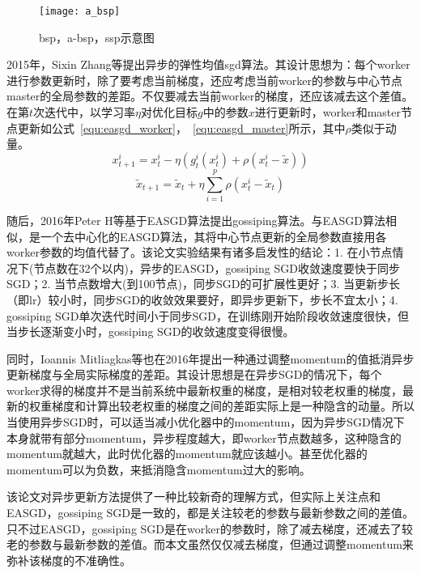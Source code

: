 \begin{figure}[htp]
\centering
\texttt{[image: a\_bsp]}
\caption{bsp，a-bsp，ssp示意图}
\label{fig:a_bsp}
\end{figure}
2015年，Sixin Zhang等提出异步的弹性均值sgd算法。其设计思想为：每个worker进行参数更新时，除了要考虑当前梯度，还应考虑当前worker的参数与中心节点master的全局参数的差距。不仅要减去当前worker的梯度，还应该减去这个差值。在第$t$次迭代中，以学习率$\eta$对优化目标$g$中的参数$x$进行更新时，worker和master节点更新如公式~\ref{equ:easgd_worker}，~\ref{equ:easgd_master}所示，其中$\rho$类似于动量。
\begin{equation}
\label{equ:easgd_worker}
x^{i}_{t+1}=x^i_t-\eta(g^i_t(x^i_t)+\rho(x^i_t-\widetilde x))
\end{equation}
\begin{equation}
\label{equ:easgd_master}
\widetilde x_{t+1}=\widetilde x_t +\eta \sum_{i=1}^{p}\rho(x^i_t - \widetilde x_t)
\end{equation}

随后，2016年Peter H等基于EASGD算法提出gossiping算法。与EASGD算法相似，是一个去中心化的EASGD算法，其将中心节点更新的全局参数直接用各worker参数的均值代替了。该论文实验结果有诸多启发性的结论：1. 在小节点情况下(节点数在32个以内)，异步的EASGD，gossiping SGD收敛速度要快于同步SGD；2. 当节点数增大(到100节点)，同步SGD的可扩展性更好；3. 当更新步长（即lr）较小时，同步SGD的收敛效果要好，即异步更新下，步长不宜太小；4. gossiping SGD单次迭代时间小于同步SGD，在训练刚开始阶段收敛速度很快，但当步长逐渐变小时，gossiping SGD的收敛速度变得很慢。

同时，Ioannis Mitliagkas等也在2016年提出一种通过调整momentum的值抵消异步更新梯度与全局实际梯度的差距。其设计思想是在异步SGD的情况下，每个worker求得的梯度并不是当前系统中最新权重的梯度，是相对较老权重的梯度，最新的权重梯度和计算出较老权重的梯度之间的差距实际上是一种隐含的动量。所以当使用异步SGD时，可以适当减小优化器中的momentum，因为异步SGD情况下本身就带有部分momentum，异步程度越大，即worker节点数越多，这种隐含的momentum就越大，此时优化器的momentum就应该越小。甚至优化器的momentum可以为负数，来抵消隐含momentum过大的影响。

该论文对异步更新方法提供了一种比较新奇的理解方式，但实际上关注点和EASGD，gossiping SGD是一致的，都是关注较老的参数与最新参数之间的差值。只不过EASGD，gossiping SGD是在worker的参数时，除了减去梯度，还减去了较老的参数与最新参数的差值。而本文虽然仅仅减去梯度，但通过调整momentum来弥补该梯度的不准确性。

